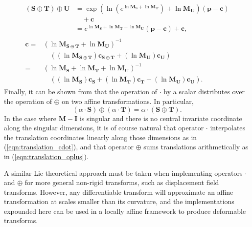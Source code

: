         \begin{gather}
          \begin{split}
            (\mathbf{S} \oplus \mathbf{T}) \oplus \mathbf{U} &= \exp(\ln(e^{\ln\mathbf{M_S} + \ln\mathbf{M_T}}) + \ln\mathbf{M_U})(\mathbf{p} - \mathbf{c}) \\
                                                             &\quad + \mathbf{c} \\
                                                             &= e^{\ln\mathbf{M_S} + \ln\mathbf{M_T} + \ln\mathbf{M_U}}(\mathbf{p} - \mathbf{c}) + \mathbf{c},
          \end{split} \\
          \begin{split}
            \mathbf{c} =& (\ln\mathbf{M_{S \oplus T}} + \ln\mathbf{M_U})^{-1} \\
                       &\quad ((\ln\mathbf{M_{S \oplus T}})\mathbf{c_{S \oplus T}} + (\ln\mathbf{M_U})\mathbf{c_U}) \\
                       =& (\ln\mathbf{M_S} + \ln\mathbf{M_T} + \ln\mathbf{M_U})^{-1} \\
                       &\quad ((\ln\mathbf{M_S})\mathbf{c_S} + (\ln\mathbf{M_T})\mathbf{c_T} + (\ln\mathbf{M_U})\mathbf{c_U}).
          \end{split}
        \end{gather}
        Finally, it can be shown from  that the operation of $\cdot$ by a scalar distributes over the operation of $\oplus$ on two affine transformations. In particular,
        \begin{equation}
          (\alpha \cdot \mathbf{S}) \oplus (\alpha \cdot \mathbf{T}) = \alpha \cdot (\mathbf{S} \oplus \mathbf{T}).
        \end{equation}
        In the case where $\mathbf{M} - \mathbf{I}$ is singular and there is no central invariate coordinate along the singular dimensions, it is of course natural that operator $\cdot$ interpolates the translation coordinates linearly along those dimensions as in (\ref{eqn:translation_cdot}), and that operator $\oplus$ sums translations arithmetically as in (\ref{eqn:translation_oplus}).
        
        A similar Lie theoretical approach must be taken when implementing operators $\cdot$ and $\oplus$ for more general non-rigid transforms, such as displacement field transforms. However, any differentiable transform will approximate an affine transformation at scales smaller than its curvature, and the implementations expounded here can be used in a locally affine framework to produce deformable transforms.
	
